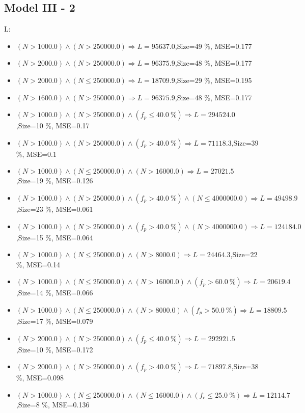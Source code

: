 \documentclass[numbered]{CSL}
\begin{document}
\subsection{Model III - 2}
L:
\begin{itemize}
\item $(N > 1000.0) \land (N > 250000.0) \Rightarrow L = 95637.0$,\hfill Size=49 \%, MSE=0.177
\item $(N > 2000.0) \land (N > 250000.0) \Rightarrow L = 96375.9$,\hfill Size=48 \%, MSE=0.177
\item $(N > 2000.0) \land (N \leq 250000.0) \Rightarrow L = 18709.9$,\hfill Size=29 \%, MSE=0.195
\item $(N > 1600.0) \land (N > 250000.0) \Rightarrow L = 96375.9$,\hfill Size=48 \%, MSE=0.177
\item $(N > 1000.0) \land (N > 250000.0) \land (f_p \leq 40.0~\%) \Rightarrow L = 294524.0$,\hfill Size=10 \%, MSE=0.17
\item $(N > 1000.0) \land (N > 250000.0) \land (f_p > 40.0~\%) \Rightarrow L = 71118.3$,\hfill Size=39 \%, MSE=0.1
\item $(N > 1000.0) \land (N \leq 250000.0) \land (N > 16000.0) \Rightarrow L = 27021.5$,\hfill Size=19 \%, MSE=0.126
\item $(N > 1000.0) \land (N > 250000.0) \land (f_p > 40.0~\%) \land (N \leq 4000000.0) \Rightarrow L = 49498.9$,\hfill Size=23 \%, MSE=0.061
\item $(N > 1000.0) \land (N > 250000.0) \land (f_p > 40.0~\%) \land (N > 4000000.0) \Rightarrow L = 124184.0$,\hfill Size=15 \%, MSE=0.064
\item $(N > 1000.0) \land (N \leq 250000.0) \land (N > 8000.0) \Rightarrow L = 24464.3$,\hfill Size=22 \%, MSE=0.14
\item $(N > 1000.0) \land (N \leq 250000.0) \land (N > 16000.0) \land (f_p > 60.0~\%) \Rightarrow L = 20619.4$,\hfill Size=14 \%, MSE=0.066
\item $(N > 1000.0) \land (N \leq 250000.0) \land (N > 8000.0) \land (f_p > 50.0~\%) \Rightarrow L = 18809.5$,\hfill Size=17 \%, MSE=0.079
\item $(N > 2000.0) \land (N > 250000.0) \land (f_p \leq 40.0~\%) \Rightarrow L = 292921.5$,\hfill Size=10 \%, MSE=0.172
\item $(N > 2000.0) \land (N > 250000.0) \land (f_p > 40.0~\%) \Rightarrow L = 71897.8$,\hfill Size=38 \%, MSE=0.098
\item $(N > 1000.0) \land (N \leq 250000.0) \land (N \leq 16000.0) \land (f_c \leq 25.0~\%) \Rightarrow L = 12114.7$,\hfill Size=8 \%, MSE=0.136

\end{itemize}
\end{document}
